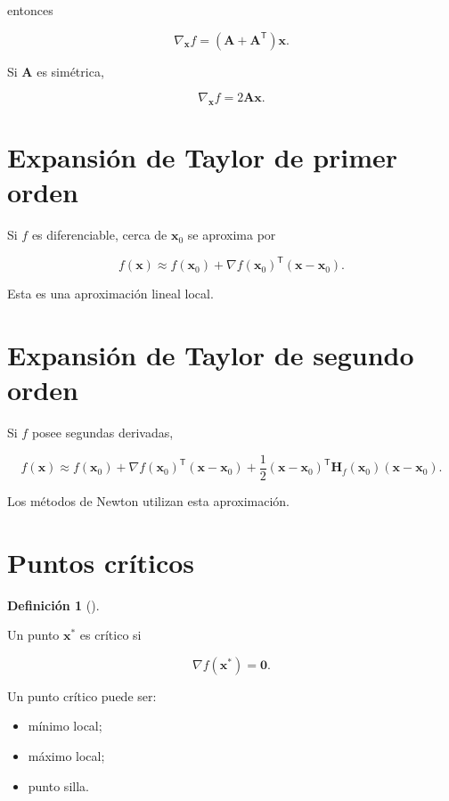 \documentclass[
  spanish,
  11pt,
  letterpaper,
  DIV=11,
  numbers=noendperiod]{scrreprt}
\providecommand{\tightlist}{%
  \setlength{\itemsep}{0pt}\setlength{\parskip}{0pt}}
\theoremstyle{definition}
\newtheorem{definition}{Definición}[chapter]
\theoremstyle{plain}
\theoremstyle{definition}
\theoremstyle{remark}
\begin{document}
entonces

\[
\nabla_{\mathbf{x}}f
=
(\mathbf{A}+\mathbf{A}^{\mathsf T})\mathbf{x}.
\]

Si \(\mathbf{A}\) es simétrica,

\[
\nabla_{\mathbf{x}}f
=
2\mathbf{A}\mathbf{x}.
\]

\section{Expansión de Taylor de primer
orden}\label{expansiuxf3n-de-taylor-de-primer-orden}

Si \(f\) es diferenciable, cerca de \(\mathbf{x}_0\) se aproxima por

\[
f(\mathbf{x})
\approx
f(\mathbf{x}_0)
+
\nabla f(\mathbf{x}_0)^{\mathsf T}
(\mathbf{x}-\mathbf{x}_0).
\]

Esta es una aproximación lineal local.

\section{Expansión de Taylor de segundo
orden}\label{expansiuxf3n-de-taylor-de-segundo-orden}

Si \(f\) posee segundas derivadas,

\[
f(\mathbf{x})
\approx
f(\mathbf{x}_0)
+
\nabla f(\mathbf{x}_0)^{\mathsf T}
(\mathbf{x}-\mathbf{x}_0)
+
\frac{1}{2}
(\mathbf{x}-\mathbf{x}_0)^{\mathsf T}
\mathbf{H}_f(\mathbf{x}_0)
(\mathbf{x}-\mathbf{x}_0).
\]

Los métodos de Newton utilizan esta aproximación.

\section{Puntos críticos}\label{puntos-cruxedticos}

\begin{definition}[]\protect\hypertarget{def-punto-critico}{}\label{def-punto-critico}

Un punto \(\mathbf{x}^{*}\) es crítico si

\[
\nabla f(\mathbf{x}^{*})
=
\mathbf{0}.
\]

\end{definition}

Un punto crítico puede ser:

\begin{itemize}
\tightlist
\item
  mínimo local;
\item
  máximo local;
\item
  punto silla.
\end{itemize}
\end{document}
